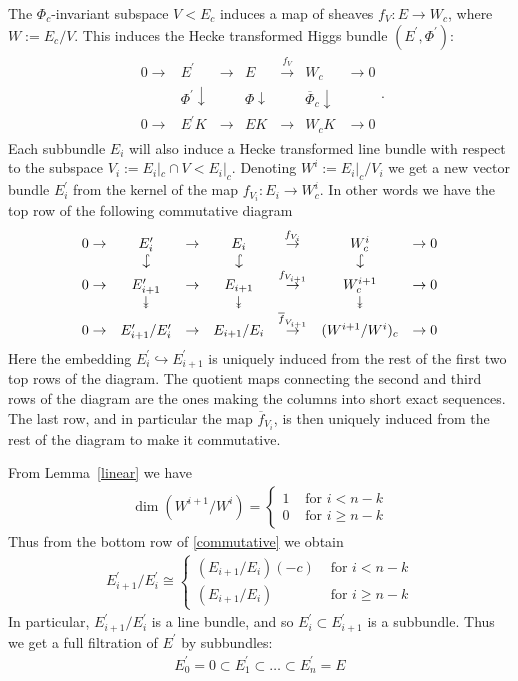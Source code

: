 \documentclass[12pt]{article}
\numberwithin{equation}{section}
\theoremstyle{remark}
\theoremstyle{definition}
\numberwithin{theorem}{section}
\def\beq{\begin{eqnarray}}
\def\eeq{\end{eqnarray}}
\def\bes{\begin{eqnarray*}}
\def\ees{\end{eqnarray*}}
\renewcommand{\1}{\mathbbm{1}}
\begin{document}
The $\Phi_c$-invariant subspace $V<E_c$ induces a map of sheaves $f_V:E\to W_c$, where $W:=E_c/V$.   This induces the Hecke transformed Higgs bundle $(E^\prime,\Phi^\prime)$:
\bes \begin{array}{ccccccc} 0 \to & E^\prime & \to &E& \stackrel{f_V}{\to} & W_c & \to 0 
	\\ & \Phi^\prime \downarrow &&\Phi \downarrow&& \overline{\Phi}_c\downarrow & \\ 0 \to & E^\prime K&\to &EK&\to& W_c K&\to 0 \end{array}.\ees 
Each subbundle $E_i$ will also induce a Hecke transformed line bundle with respect to the subspace $V_i:=E_i|_c\cap V< E_i|_c$. Denoting $W^i:=E_i|_c/V_i$ we get a new vector bundle $E_i^\prime$ from the kernel of the map $f_{V_i}:E_i\to W^i_c$. In other words we have the top row of the following commutative diagram \beq \label{commutative} \begin{array}{ccccccc} 0\to & E^\prime_i&\to &E_i& \stackrel{f_{V_i}}{\to} &W^i_c&\to 0 \\ &\rotatebox[origin=c]{-90}{$\hookrightarrow$} &&\rotatebox[origin=c]{-90}{$\hookrightarrow$} &&\rotatebox[origin=c]{-90}{$\hookrightarrow$}& \\   0\to & E_{i+1}^\prime&\to &E_{i+1}& \stackrel{f_{V_{i+1}}}{\to} &W^{i+1}_c&\to 0 \\ &\rotatebox[origin=c]{-90}{$\twoheadrightarrow$} &&\rotatebox[origin=c]{-90}{$\twoheadrightarrow$} &&\rotatebox[origin=c]{-90}{$\twoheadrightarrow$}& \\   0\to & E_{i+1}^\prime/E^\prime_i&\to &E_{i+1}/E_i& \stackrel{\overline{f}_{V_{i+1}}}{\to} &(W^{i+1}/W^i)_c&\to 0
\end{array}\eeq Here the embedding  $E_i^\prime\hookrightarrow E_{i+1}^\prime$ is uniquely induced from the rest of the first two top rows of the diagram. The quotient maps connecting the second and third rows of the diagram are the ones making the columns  into short exact sequences. The last row, and in particular the map  $\overline{f}_{V_i}$,  is then  uniquely induced from the rest of the diagram to make it commutative. 

From Lemma~\ref{linear} we have  \beq\label{dimwi}\dim(W^{i+1}/W^i) =\left\{
\begin{array}{cc}1 & \mbox{ for } i< n-k \\ 0 & \mbox{ for } i\geq n-k \end{array}
\right.\eeq
Thus from the bottom row of \eqref{commutative} we obtain \beq \label{'quotients}E_{i+1}^\prime/E^\prime_i\cong\left\{
\begin{array}{cc}(E_{i+1}/E_i)(-c) & \mbox{ for } i< n-k \\ (E_{i+1}/E_i) & \mbox{ for } i\geq n-k \end{array}
\right.\eeq In particular, $E_{i+1}^\prime/E^\prime_i$ is a line bundle, and so $E^\prime_i\subset E^\prime_{i+1}$ is a subbundle. Thus we get a full filtration of $E^\prime$ by  subbundles: \beq \label{'filtration} E^\prime_0=0\subset E^\prime_1\subset\dots\subset E^\prime_n=E
\eeq
\end{document}
